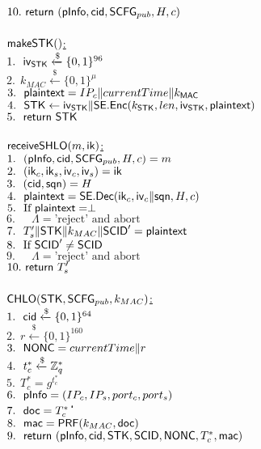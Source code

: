 $10.\  \mathsf{return}\ (\mathsf{pInfo}, \mathsf{cid}, \mathsf{SCFG}_{pub}, H, c)$ \\
\\
\underline{$\mathsf{makeSTK}()$:} \\
 $1.\ \ \mathsf{iv}_{\mathsf{STK}} \xleftarrow{\$} \{0,1\}^{96}$ \\
 $2.\ \ k_{MAC} \xleftarrow{\$} \{0,1\}^{\mu}$ \\
 $3.\ \ \mathsf{plaintext} = IP_c \| currentTime \| k_{\mathsf{MAC}}$ \\
 $4.\ \ \mathsf{STK} \leftarrow \mathsf{iv}_{\mathsf{STK}} \| \mathsf{SE}.\mathsf{Enc}(k_{\mathsf{STK}}, len, \mathsf{iv}_{\mathsf{STK}}, \mathsf{plaintext})$ \\
 $5.\ \ \mathsf{return}\ \mathsf{STK}$ \\
\\
\underline{$\mathsf{receiveSHLO}(m, \mathsf{ik})$:} \\
 $1.\ \ (\mathsf{pInfo}, \mathsf{cid}, \mathsf{SCFG}_{pub}, H, c) = m$ \\
 $2.\ \ (\mathsf{ik}_c, \mathsf{ik}_s, \mathsf{iv}_c, \mathsf{iv}_s) = \mathsf{ik}$ \\
 $3.\ \ (\mathsf{cid}, \mathsf{sqn}) = H$ \\
 $4.\ \ \mathsf{plaintext} = \mathsf{SE}.\mathsf{Dec}(\mathsf{ik}_c, \mathsf{iv}_c \| \mathsf{sqn}, H, c)$ \\
 $5.\ \ \text{If }\mathsf{plaintext} = \perp$ \\
 $6.\ \ \quad \Lambda = \text{'reject' and abort}$ \\
 $7.\ \ T_{s}^{\prime} \| \mathsf{STK} \| k_{MAC} \| \mathsf{SCID}^{\prime} = \mathsf{plaintext} $ \\
 $8.\ \ \text{If }\mathsf{SCID}^{\prime} \neq \mathsf{SCID}$ \\
 $9.\ \ \quad \Lambda = \text{'reject' and abort}$ \\
 $10.\  \mathsf{return}\ T_s^{\prime}$ \\
\\
\underline{$\mathsf{CHLO}(\mathsf{STK}, \mathsf{SCFG}_{pub}, k_{MAC})$:} \\
 $1.\ \ \mathsf{cid} \xleftarrow{\$} \{0,1\}^{64}$ \\
 $2.\ \ r \xleftarrow{\$} \{0,1\}^{160}$ \\
 $3.\ \ \mathsf{NONC} = currentTime \| r$ \\
 $4.\ \ t_c^{\ast} \xleftarrow{\$} \mathbb{Z}_{q}^{\ast}$ \\
 $5.\ \ T_c^{\ast} = g^{t_c^{\ast}}$ \\
 $6.\ \ \mathsf{pInfo} = (IP_c, IP_s, port_c, port_s)$ \\
 $7.\ \ \mathsf{doc} = T_c^{\ast}$ \| \NONC \| \cid \| \STK \| \SCID \\
 $8.\ \ \mathsf{mac} = \mathsf{PRF}(k_{MAC}, \mathsf{doc}) $ \\
 $9.\ \ \mathsf{return}\ (\mathsf{pInfo}, \mathsf{cid}, \mathsf{STK}, \mathsf{SCID}, \mathsf{NONC}, T_c^{\ast}, \mathsf{mac})$ \\
